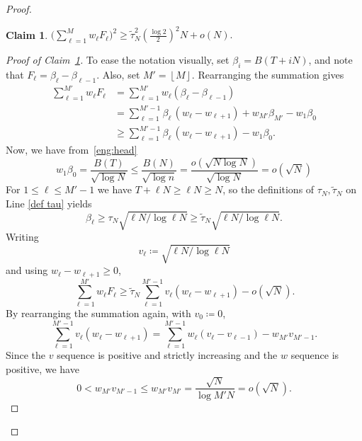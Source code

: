 \documentclass[10pt,a4paper]{amsart}
\newtheorem{claim}{Claim}
\newcommand{\floor}[1]{\mbox{$\left\lfloor #1 \right\rfloor$}}
\begin{document}
\begin{proof}
\begin{claim}\label{eq:num}
    \(\displaystyle \bigg(\sum_{\ell=1}^{M}w_\ell F_\ell\bigg)^{2} \ge \widetilde{\tau}_N^2\left(\frac{\log 2}{2}\right)^2 N+ o(N).\)
\end{claim}
\begin{proof}[Proof of Claim~\ref{eq:num}]
To ease the notation visually, set $\beta_i=B(T+iN)$, and note that $F_\ell = \beta_\ell - \beta_{\ell-1}$. Also, set $M'=\floor{M}$. Rearranging the summation gives
\begin{align*}
   \sum_{\ell=1}^{M'}w_\ell F_\ell
   &=\sum_{\ell=1}^{M'}w_\ell(\beta_\ell-\beta_{\ell-1})\\
   &=\sum_{\ell=1}^{M'-1}\beta_\ell\,(w_\ell-w_{\ell+1})+w_{M'} \beta_{M'}-w_1\beta_0 \\
   &\ge\sum_{\ell=1}^{M'-1}\beta_\ell\,(w_\ell-w_{\ell+1})-w_1\beta_0.
\end{align*}
Now, we have from~\ref{eng:head}
    \[w_1\beta_0=\frac{B(T)}{\sqrt{\log N}}\le \frac{B(N)}{\sqrt{\log n}} = \frac{o(\sqrt{N \log N})}{\sqrt{\log N}} =o(\sqrt N)\]
For $1\le\ell\le M'-1$ we have 
$T+\ell N\ge\ell N\ge N$, so the definitions of $\tau_N,\widetilde{\tau}_N$ on Line \eqref{def tau} yields
  \[\beta_\ell\ge\tau_N \sqrt{\ell N/\log \ell N}  \ge \widetilde{\tau}_N \sqrt{\ell N/\log \ell N} .\] 
Writing 
    \[v_\ell\coloneqq \sqrt{\ell N/\log \ell N}\] 
and using $w_\ell-w_{\ell+1}\ge0$,
\[
   \sum_{\ell=1}^{M'}w_\ell F_\ell
   \ge\widetilde{\tau}_N\sum_{\ell=1}^{M'-1}v_\ell(w_\ell-w_{\ell+1})-o(\sqrt N) .
\]
By rearranging the summation again, with $v_0\coloneqq 0$,
\[
   \sum_{\ell=1}^{M'-1}v_\ell(w_\ell-w_{\ell+1})
   =\sum_{\ell=1}^{M'-1}w_\ell(v_\ell-v_{\ell-1})-w_{{M'}}v_{M' -1}.
\]
Since the $v$ sequence is positive and strictly increasing and the $w$ sequence is positive, we have
    \begin{equation*}
    0 < w_{M'}v_{M'-1} 
    \le w_{M'}v_{M'}
    = \frac{\sqrt{N}}{\log M'N} 
    =o(\sqrt N).
    \end{equation*}


\end{proof}
\end{proof}
\end{document}
